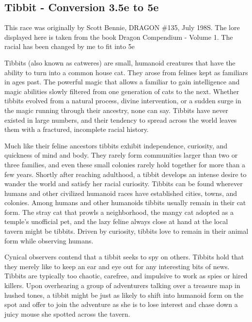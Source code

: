\subsection{Tibbit - Conversion 3.5e to 5e}
\begin{quotebox}
This race was originally by Scott Bennie, DRAGON \#135, July 198S. The lore displayed here is taken from the book Dragon Compendium - Volume 1. The racial has been changed by me to fit into 5e
\end{quotebox}

Tibbits (also known as catweres) are small, humanoid creatures that have the ability to turn into a common house cat. They arose from felines kept as familiars in ages past. The powerful magic that allows a familiar to gain intelligence and magic abilities slowly filtered from one generation of cats to the next. Whether tibbits evolved from a natural process, divine intervention, or a sudden surge in the magic running through their ancestry, none can say. Tibbits have never existed in large numbers, and their tendency to spread across the world leaves them with a fractured, incomplete racial history.

Much like their feline ancestors tibbits exhibit independence, curiosity, and quickness of mind and body. They rarely form communities larger than two or three families, and even these small colonies rarely hold together for more than a few years. Shortly after reaching adulthood, a tibbit develops an intense desire to wander the world and satisfy her racial curiosity. Tibbits can be found wherever humans and other civilized humanoid races have established cities, towns, and colonies. Among humans and other humanoids tibbits usually remain in their cat form. The stray cat that prowls a neighborhood, the mangy cat adopted as a temple's
unofficial pet, and the lazy feline always close at hand at the local tavern might be tibbits. Driven by curiosity, tibbits love to remain in their animal form while
observing humans. 

Cynical observers contend that a tibbit seeks to spy on others. Tibbits hold that they merely like to keep an ear and eye out for any interesting bits of news. Tibbits are typically too chaotic, carefree, and impulsive to work as spies or hired killers. Upon overhearing a group of adventurers talking over a treasure map in hushed tones, a tibbit might be just as likely to shift into humanoid form on the spot and offer to join the adventure as she is to lose interest and chase down a juicy mouse she spotted across the tavern. 

